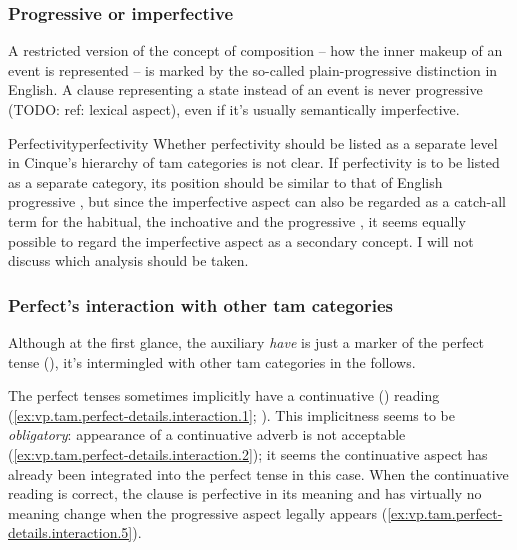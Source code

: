 \documentclass[UTF8, a4paper, oneside, scheme=plain, 12pt]{ctexbook}
\newcommand*{\citesec}[1]{\S~{#1}}
\newcommand*{\citepage}[1]{p.~{#1}}
\newcommand{\form}[1]{\emph{#1}}
\begin{document}
\subsubsection{Progressive or imperfective}

A restricted version of the concept of composition 
-- how the inner makeup of an event is represented \citep[\citesec{19.10}]{dixon2012basic3} -- 
is marked by the so-called plain-progressive distinction in English.
A clause representing a state instead of an event 
is never progressive (TODO: ref: lexical aspect),
even if it's usually semantically imperfective.


\begin{infobox}{Perfectivity}{perfectivity}
    Whether perfectivity should be listed as a separate level 
    in Cinque's hierarchy of \acs{tam} categories is not clear. 
    If perfectivity is to be listed as a separate category,
    its position should be similar to that of English progressive \citet{pearce2015completing},
    but since the imperfective aspect 
    can also be regarded as a catch-all term 
    for the habitual, the inchoative and the progressive \citep[\citepage{255}]{van2011tense},
    it seems equally possible to regard the imperfective aspect 
    as a secondary concept. 
    I will not discuss which analysis should be taken.
\end{infobox}

\subsubsection{Perfect's interaction with other \ac{tam} categories}

Although at the first glance, 
the auxiliary \form{have} is just a marker of the perfect tense
(),
it's intermingled with other \ac{tam} categories in the follows. 

The perfect tenses sometimes implicitly have a continuative () reading
(\ref{ex:vp.tam.perfect-details.interaction.1}; \citealt[\citepage{141}]{cgel}).
This implicitness seems to be \emph{obligatory}:
appearance of a continuative adverb is not acceptable
(\ref{ex:vp.tam.perfect-details.interaction.2});
it seems the continuative aspect has already been integrated 
into the perfect tense in this case.
When the continuative reading is correct,
the clause is perfective in its meaning 
and has virtually no meaning change when the progressive aspect legally appears 
(\ref{ex:vp.tam.perfect-details.interaction.5}). 
\end{document}
